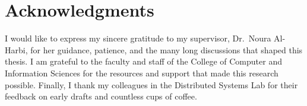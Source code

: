 \chapter*{Acknowledgments}
\thispagestyle{empty}

I would like to express my sincere gratitude to my supervisor, Dr.\ Noura
Al-Harbi, for her guidance, patience, and the many long discussions that
shaped this thesis. I am grateful to the faculty and staff of the College of
Computer and Information Sciences for the resources and support that made
this research possible. Finally, I thank my colleagues in the Distributed
Systems Lab for their feedback on early drafts and countless cups of coffee.

